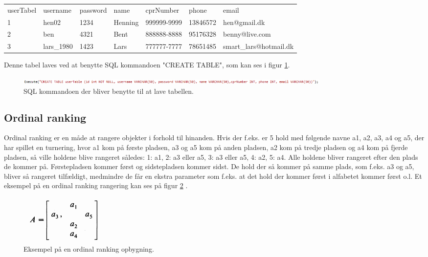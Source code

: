 \begin{table}[h]
\begin{tabular}{lllllll}
\cline{1-1}
\multicolumn{1}{|l|}{userTabel} & username   & password & name    & cprNumber   & phone    & email                  \\ \cline{1-1}
1                               & hen02      & 1234     & Henning & 999999-9999 & 13846572 & hen@gmail.dk           \\
2                               & ben        & 4321     & Bent    & 888888-8888 & 95176328 & benny@live.com         \\
3                               & lars\_1980 & 1423     & Lars    & 777777-7777 & 78651485 & smart\_lars@hotmail.dk
\end{tabular}
\end{table}

Denne tabel laves ved at benytte SQL kommandoen "CREATE TABLE", som kan ses i figur \ref{fig:sqlcreate}.

\begin{figure}[H]
\centering
\includegraphics[width=16cm]{figures/SQLcreate.PNG}
\caption{SQL kommandoen der bliver benytte til at lave tabellen.}
\label{fig:sqlcreate}
\end{figure}

\subsection{Ordinal ranking}
Ordinal ranking er en måde at rangere objekter i forhold til hinanden. Hvis der f.eks. er 5 hold med følgende navne a1, a2, a3, a4 og a5, der har spillet en turnering, hvor a1 kom på første pladsen, a3 og a5 kom på anden pladsen, a2 kom på tredje pladsen og a4 kom på fjerde pladsen, så ville holdene blive rangeret således: 1: a1, 2: a3 eller a5, 3: a3 eller a5, 4: a2, 5: a4. Alle holdene bliver rangeret efter den plads de kommer på. Førstepladsen kommer først og sidstepladsen kommer sidst. De hold der så kommer på samme plads, som f.eks. a3 og a5, bliver så rangeret tilfældigt, medmindre de får en ekstra parameter som f.eks. at det hold der kommer først i alfabetet kommer først o.l. Et eksempel på en ordinal ranking rangering kan ses på figur \ref{fig:ranking} \citep{Cook1985, Cook1986}.

\begin{figure}[H]
\centering
\includegraphics{figures/ranking.PNG}
\caption{Eksempel på en ordinal ranking opbygning.}
\label{fig:ranking}
\end{figure}

